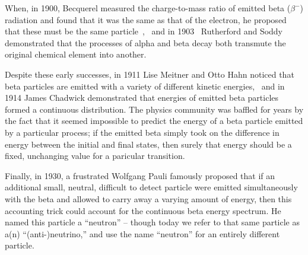 
When, in 1900, Becquerel measured the charge-to-mass ratio of emitted beta ($\beta^-$) radiation and found that it was the same as that of the electron, he proposed that these must be the same particle~\cite{becquerel1900},~ and in 1903~ Rutherford and Soddy demonstrated that the processes of alpha and beta decay both transmute the original chemical element into another\cite{rutherfordsoddy1903}.


Despite these early successes, in 1911 Lise Meitner and Otto Hahn noticed that beta particles are emitted with a variety of different kinetic energies,~ and in 1914 James Chadwick
demonstrated that energies of emitted beta particles formed a continuous distribution.  The physics community was baffled for years by the fact that it seemed impossible to predict the energy of a beta particle emitted by a particular process;  if the emitted beta simply took on the difference in energy between the initial and final states, then surely that energy should be a fixed, unchanging value for a paricular transition. 

Finally, in 1930, a frustrated Wolfgang Pauli famously proposed that if an additional small, neutral, difficult to detect particle were emitted simultaneously with the beta and allowed to carry away a varying amount of energy, then this accounting trick could account for the continuous beta energy spectrum.
He named this particle a ``neutron'' -- though today we refer to that same particle as a(n) ``(anti-)neutrino,'' and use the name ``neutron'' for an entirely different particle\cite{PauliNeutrino1978}.  

